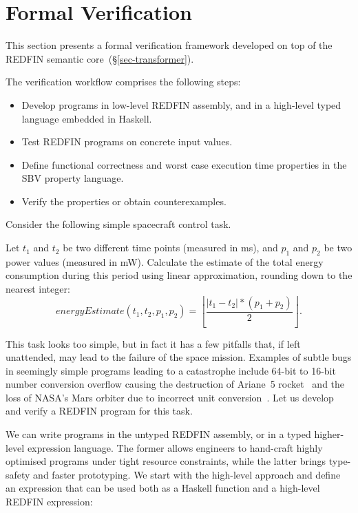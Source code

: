 \section{Formal Verification\label{sec-verification}}

This section presents a formal verification framework developed on top of
the REDFIN semantic core~(\S\ref{sec-transformer}).

\noindent
The verification workflow comprises the following steps:

\begin{itemize}
    \item Develop programs in low-level REDFIN assembly, and in a high-level
    typed language embedded in Haskell.
    \item Test REDFIN programs on concrete input values.
    \item Define functional correctness and worst case execution time properties
    in the SBV property language.
    \item Verify the properties or obtain counterexamples.
\end{itemize}

\noindent
Consider the following simple spacecraft control task.

\begin{tcolorbox}
Let $t_1$ and $t_2$ be two different time points (measured in ms),
and $p_1$ and $p_2$ be two power values (measured in mW).
Calculate the estimate of the total energy consumption during this period
using linear approximation, rounding down to the nearest integer:
\[
\textit{energyEstimate}(t_1, t_2, p_1, p_2) = \left\lfloor \frac{|t_1 - t_2| * (p_1 + p_2)}{2} \right\rfloor.
\]
\end{tcolorbox}

\noindent
This task looks too simple, but in fact it has a few pitfalls that,
if left unattended, may lead to the failure of the space mission. Examples
of subtle bugs in seemingly simple programs leading to a catastrophe include 64-bit
to 16-bit number conversion overflow causing the destruction of Ariane~5
rocket~\cite{bug-rocket} and the loss of NASA's Mars orbiter due to incorrect
unit conversion~\cite{NASA:1999:Mars}. Let us develop and verify
a REDFIN program for this task.

We can write programs in the untyped REDFIN assembly, or in a typed higher-level
expression language. The former allows engineers to hand-craft highly optimised
programs under tight resource constraints, while the latter brings type-safety
and faster prototyping. We start with the high-level approach and define an
expression that can be used both as a Haskell function and a high-level REDFIN
expression:

